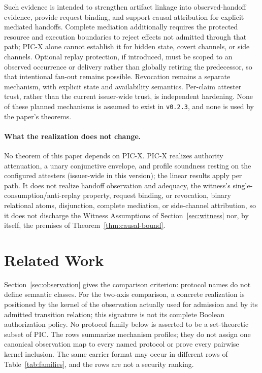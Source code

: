 \documentclass[10pt,twocolumn]{article}
\begin{document}
Such evidence is intended to strengthen artifact linkage into observed-handoff
evidence, provide request binding, and support causal attribution for explicit
mediated handoffs. Complete mediation additionally requires the protected
resource and execution boundaries to reject effects not admitted through that
path; PIC-X alone cannot establish it for hidden state, covert channels, or
side channels. Optional replay protection, if introduced, must be scoped to an
observed occurrence or delivery rather than globally retiring the predecessor,
so that intentional fan-out remains possible. Revocation remains a separate
mechanism, with explicit state and availability semantics. Per-claim attester
trust, rather than the current issuer-wide trust, is independent hardening.
None of these planned mechanisms is assumed to exist in \texttt{v0.2.3}, and
none is used by the paper's theorems.

\paragraph{What the realization does not change.}
No theorem of this paper depends on PIC-X. PIC-X realizes authority
attenuation, a unary conjunctive envelope, and profile soundness resting on the
configured attesters (issuer-wide in this version); the linear results apply
per path. It does
not realize handoff observation and adequacy, the witness's
single-consumption/anti-replay property, request binding, or
revocation, binary relational atoms, disjunction, complete mediation, or
side-channel attribution, so it does not discharge the Witness Assumptions of
Section~\ref{sec:witness} nor, by itself, the premises of
Theorem~\ref{thm:causal-bound}.

\section{Related Work}
\label{sec:related}

Section~\ref{sec:observation} gives the comparison criterion: protocol names do
not define semantic classes. For the two-axis comparison, a concrete
realization is positioned by the kernel of the observation actually used for
admission and by its admitted transition relation; this signature is not its
complete Boolean authorization policy. No protocol family below is asserted to
be a set-theoretic subset of PIC. The rows summarize mechanism profiles; they do not assign one canonical
observation map to every named protocol or prove every pairwise kernel
inclusion. The same carrier format may occur in different rows of
Table~\ref{tab:families}, and the rows are not a security ranking.
\end{document}
